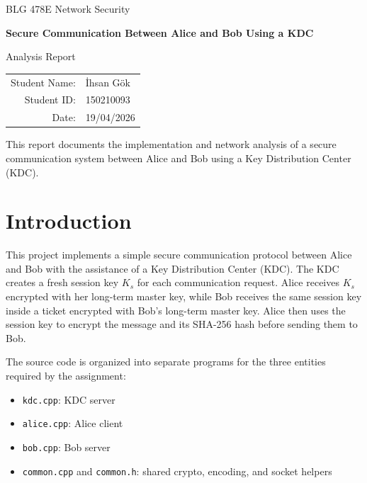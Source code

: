 \documentclass[12pt,a4paper]{article}
\newcommand{\coursename}{BLG 478E Network Security}
\newcommand{\reporttitle}{Secure Communication Between Alice and Bob Using a KDC}
\newcommand{\studentname}{İhsan Gök}
\newcommand{\studentid}{150210093}
\newcommand{\submissiondate}{19/04/2026}
\begin{document}
\begin{titlepage}
    \centering
    {\Large \coursename \par}
    \vspace{1.5cm}
    {\huge \bfseries \reporttitle \par}
    \vspace{1.5cm}
    {\Large Analysis Report \par}
    \vspace{2cm}

    \begin{tabular}{rl}
        Student Name: & \studentname \\
        Student ID: & \studentid \\
        Date: & \submissiondate \\
    \end{tabular}

    \vfill

    This report documents the implementation and network analysis of a secure
    communication system between Alice and Bob using a Key Distribution Center (KDC).
\end{titlepage}

\tableofcontents
\newpage

\section{Introduction}
This project implements a simple secure communication protocol between Alice and Bob
with the assistance of a Key Distribution Center (KDC). The KDC creates a fresh
session key \(K_s\) for each communication request. Alice receives \(K_s\) encrypted
with her long-term master key, while Bob receives the same session key inside a
ticket encrypted with Bob's long-term master key. Alice then uses the session key
to encrypt the message and its SHA-256 hash before sending them to Bob.

The source code is organized into separate programs for the three entities required
by the assignment:

\begin{itemize}
    \item \texttt{kdc.cpp}: KDC server
    \item \texttt{alice.cpp}: Alice client
    \item \texttt{bob.cpp}: Bob server
    \item \texttt{common.cpp} and \texttt{common.h}: shared crypto, encoding, and socket helpers
\end{itemize}
\end{document}
